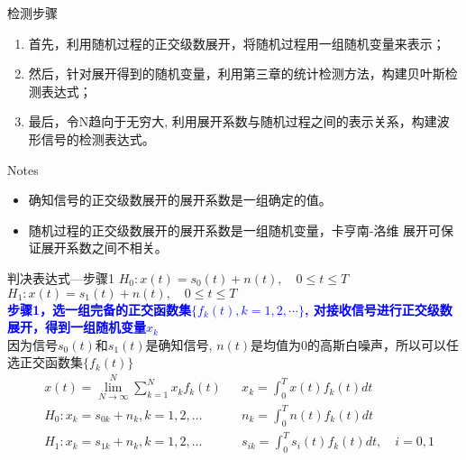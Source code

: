 \begin{frame}{检测步骤}
\begin{enumerate}
	\setlength{\itemsep}{.5cm}
	\item 首先，利用随机过程的正交级数展开，将随机过程用一组随机变量来表示；
	\item 然后，针对展开得到的随机变量，利用第三章的统计检测方法，构建贝叶斯检测表达式；
	\item 最后，令N趋向于无穷大, 利用展开系数与随机过程之间的表示关系，构建波形信号的检测表达式。
\end{enumerate}
\begin{block}{Notes}
	\begin{itemize}
		\item 确知信号的正交级数展开的展开系数是一组确定的值。
		\item 随机过程的正交级数展开的展开系数是一组随机变量，卡亨南-洛维
		展开可保证展开系数之间不相关。
	\end{itemize}
\end{block}
\end{frame}

\begin{frame}{判决表达式---步骤1}
$H_0: x(t)=s_0(t)+n(t),\quad 0\le t\le T$\\
$H_1: x(t)=s_1(t)+n(t),\quad 0\le t\le T$\\
\textbf{\textcolor{blue}{步骤1，选一组完备的正交函数集$\{f_k(t),k=1,2,\cdots \}$, 对接收信号进行正交级数展开，得到一组随机变量$x_k$}}\\
因为信号$s_0(t)$和$s_1(t)$是确知信号, $n(t)$是均值为0的高斯白噪声，所以可以任选正交函数集$\{f_k(t)\}$
\begin{align*}
&x(t)=\lim\limits_{N\to\infty}^N\sum\limits_{k=1}^Nx_kf_k(t)&&x_k=\int_{0}^{T}x(t)f_k(t)dt \\
&H_0: x_k=s_{0k}+n_k,k=1,2,\dots &&n_k=\int_{0}^{T}n(t)f_k(t)dt\\
&H_1: x_k=s_{1k}+n_k,k=1,2,\dots &&s_{ik}=\int_{0}^{T}s_i(t)f_k(t)dt, \quad i=0,1
\end{align*}
\end{frame}

